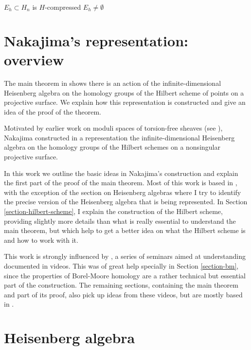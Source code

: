 \begin{theorem}
\label{theorem-e}
$E_h \subset H_n$ is $H$-compressed
$E_h \neq  \emptyset$
\end{theorem}

\section{Nakajima's representation: overview}
\label{section-intro}
\label{section-abs}

\noindent
The main theorem in \cite{Nakajima-Heis}
shows there is an action of the
infinite-dimensional
Heisenberg algebra
on the homology groups of the Hilbert
scheme of points on a projective surface.
We explain how this representation is
constructed
and give an idea of the proof of the theorem.

\noindent
Motivated by earlier work on moduli spaces
of
torsion-free sheaves
(see \cite{Nakajima-ALE}),
Nakajima constructed in \cite{Nakajima-Heis}
a representation the infinite-dimensional
Heisenberg
algebra on the homology groups of the
Hilbert schemes
on a nonsingular projective surface.

In this work we outline the basic ideas in
Nakajima's construction
and explain the first part of the proof of
the main theorem.
Most of this work is based in
\cite{Nakajima-lectures},
with the exception of the section on
Heisenberg algebras
where I try to identify the precise version
of the Heisenberg
algebra that is being represented.
In Section \ref{section-hilbert-scheme},
I explain the construction of the Hilbert
scheme,
providing slightly more details than what is
really essential
to understand the main theorem,
but which help to get a better idea on what
the Hilbert scheme is
and how to work with it.

This work is strongly influenced by
\cite{videos},
a series of seminars aimed at understanding
\cite{Nakajima-lectures}
documented in videos.
This was of great help
specially in Section \ref{section-bm}, since
the properties of Borel-Moore homology are a
rather technical
but essential part of the construction.
The remaining sections, containing the main
theorem
and part of its proof,
also pick up ideas from these videos,
but are mostly based in
\cite{Nakajima-lectures}.


\section{Heisenberg algebra}
\label{section-heisenberg}

